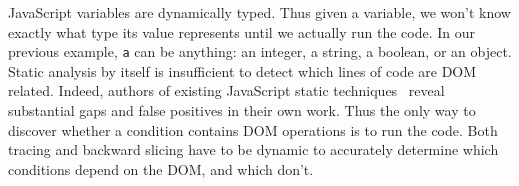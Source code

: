 JavaScript variables are dynamically typed.  Thus given a variable, we won't know exactly what type its value represents until we actually run the code.  
In our previous example, {\tt a} can be anything: an integer, a string, a boolean, or an object.  
Static analysis by itself is insufficient to detect which lines of code are DOM related.
Indeed, authors of existing JavaScript static techniques~\cite{staticJsWWW09, staticJsWWW11} reveal substantial gaps and false positives in their own work.  
Thus the only way to discover whether a condition contains DOM operations is to run the code.  Both tracing and backward slicing have to be dynamic to accurately determine which conditions depend on the DOM, and which don't.  




